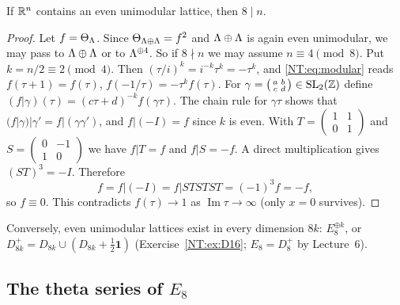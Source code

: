 \begin{theorem}\label{NT:thm:8n}
If $\mathbb{R}^n$ contains an even unimodular lattice, then $8\mid n$.
\end{theorem}

\begin{proof}
Let $f=\Theta_\Lambda$. Since $\Theta_{\Lambda\oplus\Lambda}=f^2$ and $\Lambda\oplus\Lambda$ is again even unimodular,
we may pass to $\Lambda\oplus\Lambda$ or to $\Lambda^{\oplus4}$. So if $8\nmid n$ we may assume $n\equiv4\pmod 8$.
Put $k=n/2\equiv2\pmod4$. Then $(\tau/i)^{k}=i^{-k}\tau^k=-\tau^k$, and \eqref{NT:eq:modular} reads
$f(\tau+1)=f(\tau)$, $f(-1/\tau)=-\tau^kf(\tau)$. For $\gamma=\left(\begin{smallmatrix}a&b\\c&d\end{smallmatrix}\right)\in\mathrm{SL}_2(\mathbb{Z})$
define $(f|\gamma)(\tau)=(c\tau+d)^{-k}f(\gamma\tau)$. The chain rule for $\gamma\tau$ shows
that $(f|\gamma)|\gamma'=f|(\gamma\gamma')$, and $f|(-I)=f$ since $k$ is even. With
$T=\left(\begin{smallmatrix}1&1\\0&1\end{smallmatrix}\right)$ and $S=\left(\begin{smallmatrix}0&-1\\1&0\end{smallmatrix}\right)$
we have $f|T=f$ and $f|S=-f$. A direct multiplication gives $(ST)^3=-I$. Therefore
\[
  f=f|(-I)=f|STSTST=(-1)^3f=-f,
\]
so $f\equiv0$. This contradicts $f(\tau)\to1$ as $\operatorname{Im}\tau\to\infty$ (only $x=0$ survives).
\end{proof}

Conversely, even unimodular lattices exist in every dimension $8k$: $E_8^{\oplus k}$, or
$D_{8k}^+=D_{8k}\cup(D_{8k}+\frac12\mathbf 1)$ (Exercise~\ref{NT:ex:D16}; $E_8=D_8^+$ by Lecture~6).

\subsection*{The theta series of \texorpdfstring{$E_8$}{E8}}

